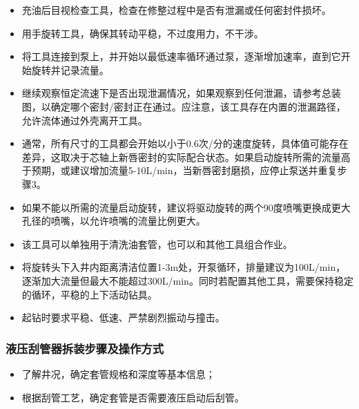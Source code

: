 \begin{itemize}
	
	\item 充油后目视检查工具，检查在修整过程中是否有泄漏或任何密封件损坏。
	
	\item 用手旋转工具，确保其转动平稳，不过度用力，不干涉。
	
	\item 将工具连接到泵上，并开始以最低速率循环通过泵，逐渐增加速率，直到它开始旋转并记录流量。
	
	\item 继续观察恒定流速下是否出现泄漏情况，如果观察到任何泄漏，请参考总装图，以确定哪个密封/密封正在通过。应注意，该工具存在内置的泄漏路径，允许流体通过外壳离开工具。
	
	\item 通常，所有尺寸的工具都会开始以小于0.6次/分的速度旋转，具体值可能存在差异，这取决于芯轴上新唇密封的实际配合状态。如果启动旋转所需的流量高于预期，或建议增加流量5-10L/min，当新唇密封磨损，应停止泵送并重复步骤3。
	
	\item 如果不能以所需的流量启动旋转，建议将驱动旋转的两个90度喷嘴更换成更大孔径的喷嘴，以允许喷嘴的流量比例更大。
	\end{itemize}
	
	\begin{itemize}
		
	\item 该工具可以单独用于清洗油套管，也可以和其他工具组合作业。
	
	\item 将旋转头下入井内距离清洁位置1-3m处，开泵循环，排量建议为100L/min，逐渐加大流量但最大不能超过300L/min。同时若配置其他工具，需要保持稳定的循环，平稳的上下活动钻具。
	
	\item 起钻时要求平稳、低速、严禁剧烈振动与撞击。
	\end{itemize}

\subsubsection{液压刮管器拆装步骤及操作方式}

		\begin{itemize}
		\item 了解井况，确定套管规格和深度等基本信息；
		\item 根据刮管工艺，确定套管是否需要液压启动后刮管。
		\end{itemize}
	
